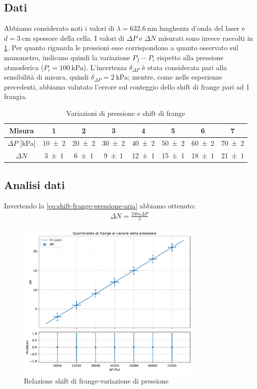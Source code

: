 \documentclass[a4paper]{article}
\begin{document}
\subsection{Dati}
Abbiamo considerato noti i valori di $\lambda=\SI{632.6}{\nano\meter}$ lunghezza d'onda del laser e $d=\SI{3}{\centi\meter}$ spessore della cella. I valori di $\Delta P$ e $\Delta N$ misurati sono invece raccolti in \cref{tab:delta-p-e-delta-n}. Per quanto riguarda le pressioni esse corrispondono a quanto osservato sul manometro, indicano quindi la variazione $P_f- P_i$ rispetto alla pressione atmosferica ($P_i = \SI{100}{\kilo\pascal}$). L'incertezza $\delta_{\Delta P}$ è stata considerata pari alla sensibilità di misura, quindi $\delta_{\Delta P}=\SI{2}{\kilo\pascal}$; mentre, come nelle esperienze precedenti, abbiamo valutato l'errore sul conteggio dello shift di frange pari ad 1 frangia.

\begin{table}[htbp]
\centering
\caption{Variazioni di pressione e shift di frange}
\label{tab:delta-p-e-delta-n}
\begin{tabular}{cccccccc}
\toprule
Misura & 1 & 2 & 3 & 4 & 5 & 6 & 7 \\
\midrule
$\Delta P$ [\si{\kilo\pascal}] & \num{10 \pm 2} & \num{20 \pm 2} & \num{30 \pm 2} & \num{40 \pm 2} & \num{50 \pm 2} & \num{60 \pm 2} & \num{70 \pm 2} \\
$\Delta N$ & \num{3 \pm 1} & \num{6 \pm 1} & \num{9 \pm 1} & \num{12 \pm 1} & \num{15 \pm 1} & \num{18 \pm 1} & \num{21 \pm 1} \\
\bottomrule
\end{tabular}
\end{table}

\subsection{Analisi dati}
Invertendo la \cref{eq:shift-frange-pressione-aria} abbiamo ottenuto:
\begin{align}
    \Delta N = \frac{2dm \Delta P}{\lambda}
\end{align}

\begin{figure}[htbp]
\centering
\includegraphics[width=0.8\textwidth]{./grafici/indice_aria.pdf}
\caption{Relazione shift di frange-variazione di pressione}
\label{fig:indice-aria}
\end{figure}
\end{document}
